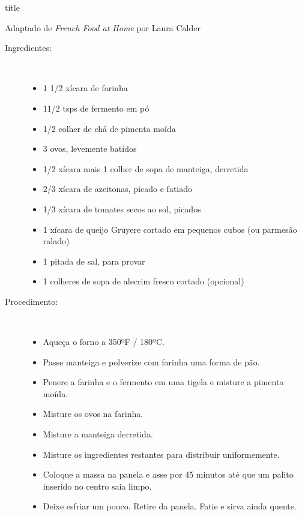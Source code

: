 \documentclass [11pt, letterpaper] {article}
\begin{document}
 {title}
\begin {flushright}
{Adaptado de {\it French Food at Home} por Laura Calder}
\end {flushright}


\vspace {0.3in}
\begin {description}

\item [Ingredientes:] \ \\
\begin {itemize}
\item 1 1/2 xícara de farinha
\item 11/2 tsps de fermento em pó
\item 1/2 colher de chá de pimenta moída
\item 3 ovos, levemente batidos
\item 1/2 xícara mais 1 colher de sopa de manteiga, derretida
\item 2/3 xícara de azeitonas, picado e fatiado
\item 1/3 xícara de tomates secos ao sol, picados
\item 1 xícara de queijo Gruyere cortado em pequenos cubos (ou parmesão ralado)
\item 1 pitada de sal, para provar
\item 1 colheres de sopa de alecrim fresco cortado (opcional)
\end {itemize}

\item [Procedimento:] \ \\
\begin {itemize}
\item Aqueça o forno a 350ºF / 180ºC.
\item Passe manteiga e polverize com farinha uma forma de p\~ao.
\item Penere a farinha e o fermento em uma tigela e misture a pimenta mo\'ida.
\item Misture os ovos na farinha.
\item Misture a manteiga derretida.
\item Misture os ingredientes restantes para distribuir uniformemente.
\item Coloque a massa na panela e asse por 45 minutos até que um palito inserido no centro saia limpo.
\item Deixe esfriar um pouco. Retire da panela. Fatie e sirva ainda quente.
\end {itemize}
\end {description}
\end{document}

